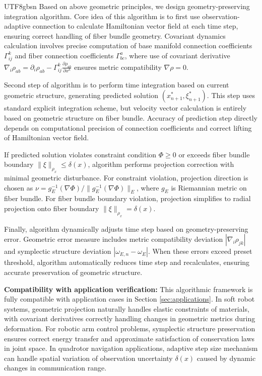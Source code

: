 \documentclass[a4paper,12pt]{extarticle}
\theoremstyle{definition}
\begin{document}
\begin{CJK}{UTF8}{gbsn}
Based on above geometric principles, we design geometry-preserving integration algorithm. Core idea of this algorithm is to first use observation-adaptive connection to calculate Hamiltonian vector field at each time step, ensuring correct handling of fiber bundle geometry. Covariant dynamics calculation involves precise computation of base manifold connection coefficients $\Gamma^k_{ij}$ and fiber connection coefficients $\Gamma^a_{bc}$, where use of covariant derivative $\nabla_i\rho_{ab} = \partial_i\rho_{ab} - \Gamma^k_{ij}\frac{\partial\rho_{ab}}{\partial x^k}$ ensures metric compatibility $\nabla\rho = 0$.

Second step of algorithm is to perform time integration based on current geometric structure, generating predicted solution $(x^*_{n+1}, \xi^*_{n+1})$. This step uses standard explicit integration scheme, but velocity vector calculation is entirely based on geometric structure on fiber bundle. Accuracy of prediction step directly depends on computational precision of connection coefficients and correct lifting of Hamiltonian vector field.

If predicted solution violates constraint condition $\Phi \geq 0$ or exceeds fiber bundle boundary $\|\xi\|_{\rho_x} \leq \delta(x)$, algorithm performs projection correction with minimal geometric disturbance. For constraint violation, projection direction is chosen as $\nu = g_E^{-1}(\nabla\Phi)/\|g_E^{-1}(\nabla\Phi)\|_E$, where $g_E$ is Riemannian metric on fiber bundle. For fiber bundle boundary violation, projection simplifies to radial projection onto fiber boundary $\|\xi\|_{\rho_x} = \delta(x)$.

Finally, algorithm dynamically adjusts time step based on geometry-preserving error. Geometric error measure includes metric compatibility deviation $|\nabla_i\rho_{jk}|$ and symplectic structure deviation $|\omega_{E,n} - \omega_E|$. When these errors exceed preset threshold, algorithm automatically reduces time step and recalculates, ensuring accurate preservation of geometric structure.

\textbf{Compatibility with application verification:} This algorithmic framework is fully compatible with application cases in Section \ref{sec:applications}. In soft robot systems, geometric projection naturally handles elastic constraints of materials, with covariant derivatives correctly handling changes in geometric metrics during deformation. For robotic arm control problems, symplectic structure preservation ensures correct energy transfer and approximate satisfaction of conservation laws in joint space. In quadrotor navigation applications, adaptive step size mechanism can handle spatial variation of observation uncertainty $\delta(x)$ caused by dynamic changes in communication range.


\end{CJK}
\end{document}
